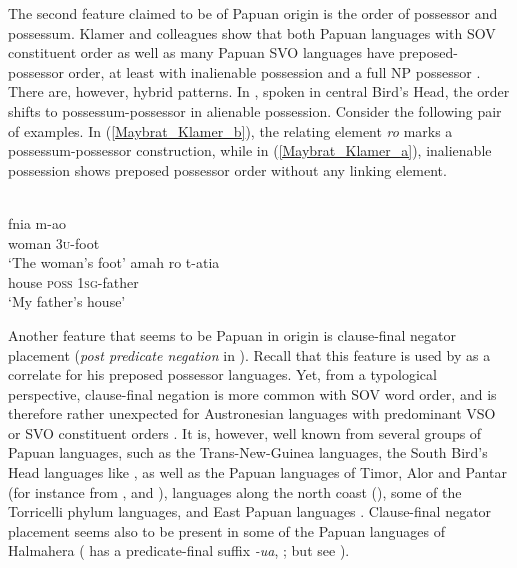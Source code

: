 The second feature claimed to be of Papuan origin is the order of possessor and possessum. Klamer and colleagues show that both Papuan languages with SOV constituent order as well as many Papuan SVO languages have preposed-possessor order, at least with inalienable possession and a full NP possessor \citep[123f.]{klamer2008east}. There are, however, hybrid patterns. In , spoken in central Bird's Head, the order shifts to possessum-possessor in alienable possession. Consider the following pair of examples. In (\ref{Maybrat_Klamer_b}), the relating element \textit{ro} marks a possessum-possessor construction, while in (\ref{Maybrat_Klamer_a}), inalienable possession shows preposed possessor order without any linking element.

\ea
{}\\
\ea \label{Maybrat_Klamer_a}
\gll fnia m-ao\\
woman \textsc{3}\textsc{u}-foot\\
\glt ‘The woman's foot’
\ex \label{Maybrat_Klamer_b}
\gll amah ro t-atia\\
house \textsc{poss} \textsc{1}\textsc{sg}-father\\
\glt ‘My father's house’
\z
\z

Another feature that seems to be Papuan in origin is clause-final negator placement (\textit{post predicate negation} in \citealt{klamer2008east}). Recall that this feature is used by \citet{Himmelmann2005austronesian} as a correlate for his preposed possessor languages. Yet, from a typological perspective, clause-final negation is more common with SOV word order, and is therefore rather unexpected for Austronesian languages with predominant VSO or SVO constituent orders \citep{klamer2008east}. It is, however, well known from several groups of Papuan languages, such as the Trans-New-Guinea languages, the South Bird's Head languages like , as well as the Papuan languages of Timor, Alor and Pantar (for instance from ,  and ),  languages along the north coast (), some of the Torricelli phylum languages, and East Papuan languages \citep{klamer2008east}. Clause-final negator placement seems also to be present in some of the Papuan languages of Halmahera ( has a predicate-final suffix \textit{-ua}, \citealt{holton2003tobelo}; but see \citealt[131]{klamer2008east}).

